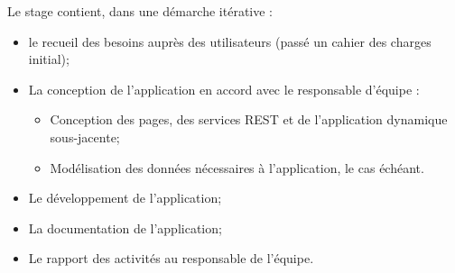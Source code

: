 Le stage contient, dans une démarche itérative :
\begin{itemize}
  \item le recueil des besoins auprès des utilisateurs (passé un cahier des charges initial);
  \item La conception de l’application en accord avec le responsable d’équipe :
  \begin{itemize}
    \item Conception des pages, des services REST et de l’application dynamique sous-jacente;
    \item Modélisation des données nécessaires à l’application, le cas échéant.
  \end{itemize}
  \item Le développement de l’application;
  \item La documentation de l’application;
  \item Le rapport des activités au responsable de l’équipe.
\end{itemize}

\clearpage
